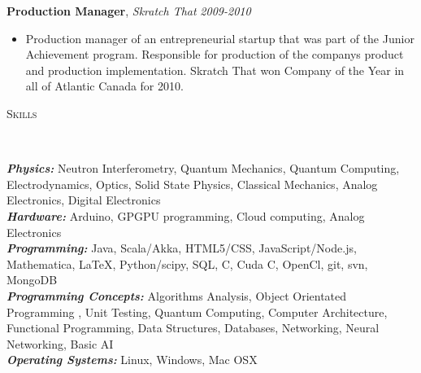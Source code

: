 \documentclass[9pt]{article}
\newenvironment{changemargin}[2]{%
  \begin{list}{}{%
    \setlength{\topsep}{0pt}%
    \setlength{\leftmargin}{#1}%
    \setlength{\rightmargin}{#2}%
    \setlength{\listparindent}{\parindent}%
    \setlength{\itemindent}{\parindent}%
    \setlength{\parsep}{\parskip}%
  }%
  \item[]}{\end{list}
}
\newcommand{\lineover}{
	\begin{changemargin}{-0.05in}{-0.05in}
		\vspace*{-8pt}
		\hrulefill \\
		\vspace*{-2pt}
	\end{changemargin}
}
\newcommand{\header}[1]{
	\begin{changemargin}{-0.5in}{-0.5in}
		\scshape{#1}\\
  	\lineover
	\end{changemargin}
}
\newenvironment{body} {
	\vspace*{-16pt}
	\begin{changemargin}{-0.25in}{-0.5in}
  }	
	{\end{changemargin}
}
\begin{document}
\begin{body}
	\textbf {Production Manager}, \emph{Skratch That} \hfill \emph{2009-2010}\\
	\vspace*{-4pt}
	\begin{itemize} \itemsep -0pt
		\item Production manager of an entrepreneurial startup that was part of the Junior Achievement program.
Responsible for production of the companys product and production implementation. Skratch That won
Company of the Year in all of Atlantic Canada for 2010.
	\end{itemize}
\end{body}

\smallskip







\header{Skills}

\begin{body}
	\vspace{14pt}

	\emph{\textbf{Physics:}}{} Neutron Interferometry, Quantum Mechanics, Quantum Computing, Electrodynamics, Optics, Solid State Physics, Classical Mechanics, Analog Electronics, Digital Electronics\\
	\medskip
	\emph{\textbf{Hardware:}}{}  Arduino, GPGPU programming, Cloud computing, Analog Electronics\\
	\medskip
	\emph{\textbf{Programming:}}{} 
Java, Scala/Akka, HTML5/CSS, JavaScript/Node.js, Mathematica, \LaTeX, Python/scipy,
SQL, C, Cuda C, OpenCl, git, svn, MongoDB\\
	\medskip
	\emph{\textbf{Programming Concepts:}}{} Algorithms Analysis, Object Orientated Programming , Unit Testing, Quantum
Computing, Computer Architecture, Functional Programming, Data Structures, Databases, Networking,
Neural Networking, Basic AI\\

	
	\medskip
	\emph{\textbf{Operating Systems:}}{} Linux, Windows, Mac OSX\\

	

	
\end{body}
\end{document}
